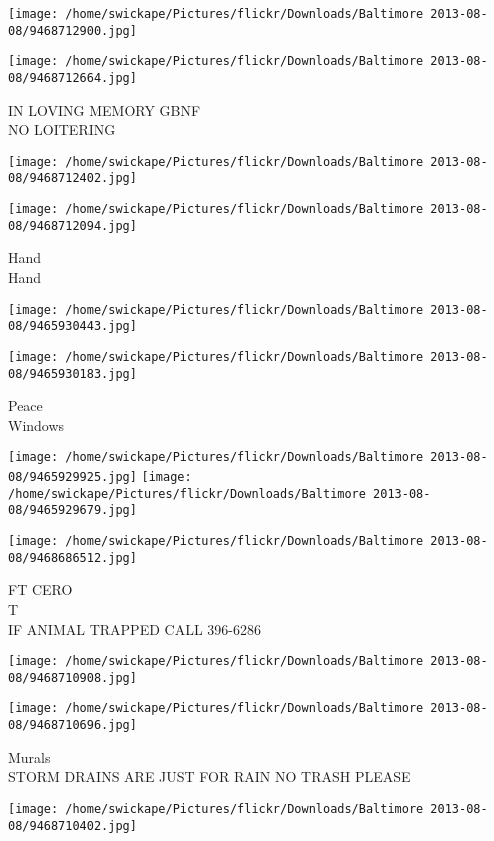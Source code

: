 \documentclass[10pt,letterpaper]{article}
\begin{document}
\texttt{[image: /home/swickape/Pictures/flickr/Downloads/Baltimore 2013-08-08/9468712900.jpg]}

\vspace{0.25in}
\texttt{[image: /home/swickape/Pictures/flickr/Downloads/Baltimore 2013-08-08/9468712664.jpg]}

IN LOVING MEMORY GBNF\\
NO LOITERING
\pagebreak

\texttt{[image: /home/swickape/Pictures/flickr/Downloads/Baltimore 2013-08-08/9468712402.jpg]}

\vspace{0.25in}
\texttt{[image: /home/swickape/Pictures/flickr/Downloads/Baltimore 2013-08-08/9468712094.jpg]}

Hand\\
Hand
\pagebreak

\texttt{[image: /home/swickape/Pictures/flickr/Downloads/Baltimore 2013-08-08/9465930443.jpg]}

\vspace{0.25in}
\texttt{[image: /home/swickape/Pictures/flickr/Downloads/Baltimore 2013-08-08/9465930183.jpg]}

Peace\\
Windows
\pagebreak

\texttt{[image: /home/swickape/Pictures/flickr/Downloads/Baltimore 2013-08-08/9465929925.jpg]}
\texttt{[image: /home/swickape/Pictures/flickr/Downloads/Baltimore 2013-08-08/9465929679.jpg]}

\texttt{[image: /home/swickape/Pictures/flickr/Downloads/Baltimore 2013-08-08/9468686512.jpg]}

FT CERO\\
T\\
IF ANIMAL TRAPPED CALL 396{-}6286
\pagebreak

\texttt{[image: /home/swickape/Pictures/flickr/Downloads/Baltimore 2013-08-08/9468710908.jpg]}

\vspace{0.25in}
\texttt{[image: /home/swickape/Pictures/flickr/Downloads/Baltimore 2013-08-08/9468710696.jpg]}

Murals\\
STORM DRAINS ARE JUST FOR RAIN NO TRASH PLEASE
\pagebreak

\texttt{[image: /home/swickape/Pictures/flickr/Downloads/Baltimore 2013-08-08/9468710402.jpg]}
\end{document}
